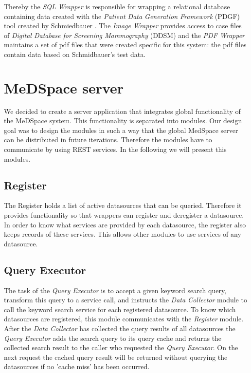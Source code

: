 Thereby the \emph{SQL Wrapper} is responsible for wrapping a relational database containing data created with the \emph{Patient Data Generation Framework} (PDGF) tool created by Schmiedbauer \cite{SchmidbauerBachelorThesis}. The \emph{Image Wrapper} provides access to case files of \emph{Digital Database for Screening Mammography} (DDSM)\cite{DDSM} and the \emph{PDF Wrapper} maintains a set of pdf files that were created specific for this system: the pdf files contain data based on Schmidbauer's test data.


\section{MeDSpace server}

We decided to create a server application that integrates global functionality of the MeDSpace system. This functionality is separated into modules. Our design goal was to design the modules in such a way that the global MedSpace server can be distributed in future iterations. 
Therefore the modules have to communicate by using REST services.
In the following we will present this modules.

\subsection{Register}
The Register holds a list of active datasources that can be queried. Therefore it provides functionality so that wrappers can register and deregister a datasource. In order to know what services are provided by each datasource, the register also keeps records of these services. This allows other modules to use services of any datasource.
\subsection{Query Executor}
The task of the \emph{Query Executor} is to accept a given keyword search query, transform this query to a service call, and instructs the \emph{Data Collector} module to call the keyword search service for each registered datasource. To know which datasources are registered, this module communicates with the \emph{Register} module. After the \emph{Data Collector} has collected the query results of all datasources the \emph{Query Executor} adds the search query to its query cache and returns the collected search result to the caller who requested the \emph{Query Executor}. On the next request the cached query result will be returned without querying the datasources if no 'cache miss' has been occurred.

